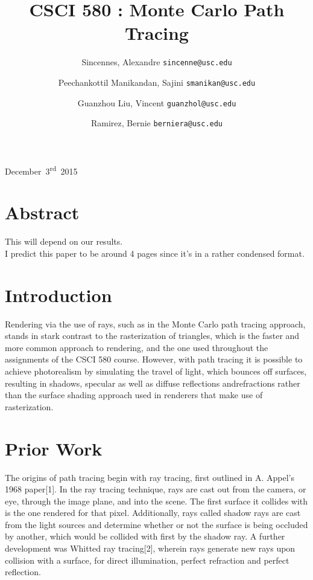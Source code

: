 \documentclass[journal]{IEEEtran}
\begin{document}
\title{CSCI 580 : Monte Carlo Path Tracing}
{December~3\textsuperscript{rd}~2015}
\author{
	Sincennes, Alexandre
	\texttt{sincenne@usc.edu}\\
	\and
 	Peechankottil Manikandan, Sajini
 	\texttt{smanikan@usc.edu}\\
  	\and
	Guanzhou Liu, Vincent
 	\texttt{guanzhol@usc.edu}\\
  	\and
	Ramirez, Bernie
 	\texttt{berniera@usc.edu}\\
  
}
\maketitle


\section{Abstract}
This will depend on our results.\\
I predict this paper to be around 4 pages since it's in a rather condensed format.


\section{Introduction}
Rendering via the use of rays, such as in the Monte Carlo path tracing approach, stands in stark contrast to the rasterization of triangles, which is the faster and more common approach to rendering, and the one used throughout the assignments of the CSCI 580 course. However, with path tracing it is possible to achieve photorealism by simulating the travel of light, which bounces off surfaces, resulting in shadows, specular as well as diffuse reflections andrefractions rather than the surface shading approach used in renderers that make use of rasterization.


\section{Prior Work}
The origins of path tracing begin with ray tracing, first outlined in A. Appel's 1968 paper[1]. In the ray tracing technique, rays are cast out from the camera, or eye, through the image plane, and into the scene. The first surface it collides with is the one rendered for that pixel. Additionally, rays called shadow rays are cast from the light sources and determine whether or not the surface is being occluded by another, which would be collided with first by the shadow ray. A further development was Whitted ray tracing[2], wherein rays generate new rays upon collision with a surface, for direct illumination, perfect refraction and perfect reflection.
\end{document}
